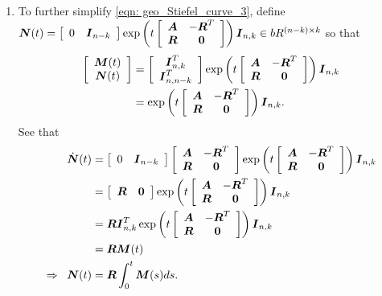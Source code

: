 \documentclass[11pt]{article}
\begin{document}
\begin{enumerate}
\item To further simplify \eqref{eqn: geo_Stiefel_curve_3}, define $\boldsymbol{N}(t)=\left[\begin{array}{cc}
0 & \boldsymbol{I}_{n-k}
\end{array} \right]\exp\left(t\left[\begin{array}{cc}
\boldsymbol{A} & -\boldsymbol{R}^{T} \\ 
\boldsymbol{R}& \boldsymbol{0}
\end{array} \right]\right)\boldsymbol{I}_{n,k} \in bR^{(n-k)\times k}$  so that 
\begin{align*}
\left[\begin{array}{c}
\boldsymbol{M}(t) \\ 
\boldsymbol{N}(t)
\end{array} \right] &= \left[\begin{array}{c}
\boldsymbol{I}_{n,k}^{T} \\ 
\boldsymbol{I}_{n,n-k}^{T}
\end{array} \right]\exp\left(t\left[\begin{array}{cc}
\boldsymbol{A} & -\boldsymbol{R}^{T} \\ 
\boldsymbol{R}& \boldsymbol{0}
\end{array} \right]\right)\boldsymbol{I}_{n,k}\\
&=\exp\left(t\left[\begin{array}{cc}
\boldsymbol{A} & -\boldsymbol{R}^{T} \\ 
\boldsymbol{R}& \boldsymbol{0}
\end{array} \right]\right)\boldsymbol{I}_{n,k}.
\end{align*}
See that 
\begin{align*}
\dot{\boldsymbol{N}}(t) &= \left[\begin{array}{cc}
0 & \boldsymbol{I}_{n-k}
\end{array} \right]\left[\begin{array}{cc}
\boldsymbol{A} & -\boldsymbol{R}^{T} \\ 
\boldsymbol{R}& \boldsymbol{0}
\end{array} \right]\exp\left(t\left[\begin{array}{cc}
\boldsymbol{A} & -\boldsymbol{R}^{T} \\ 
\boldsymbol{R}& \boldsymbol{0}
\end{array} \right]\right)\boldsymbol{I}_{n,k}\\
&=\left[\begin{array}{cc}
\boldsymbol{R}& \boldsymbol{0}
\end{array} \right]\exp\left(t\left[\begin{array}{cc}
\boldsymbol{A} & -\boldsymbol{R}^{T} \\ 
\boldsymbol{R}& \boldsymbol{0}
\end{array} \right]\right)\boldsymbol{I}_{n,k}\\
&=\boldsymbol{R}\boldsymbol{I}_{n,k}^{T}\exp\left(t\left[\begin{array}{cc}
\boldsymbol{A} & -\boldsymbol{R}^{T} \\ 
\boldsymbol{R}& \boldsymbol{0}
\end{array} \right]\right)\boldsymbol{I}_{n,k}\\
&= \boldsymbol{R}\boldsymbol{M}(t)\\
\Rightarrow\;\; \boldsymbol{N}(t) &= \boldsymbol{R}\int_{0}^{t} \boldsymbol{M}(s) ds.
\end{align*}


\end{enumerate}
\end{document}
